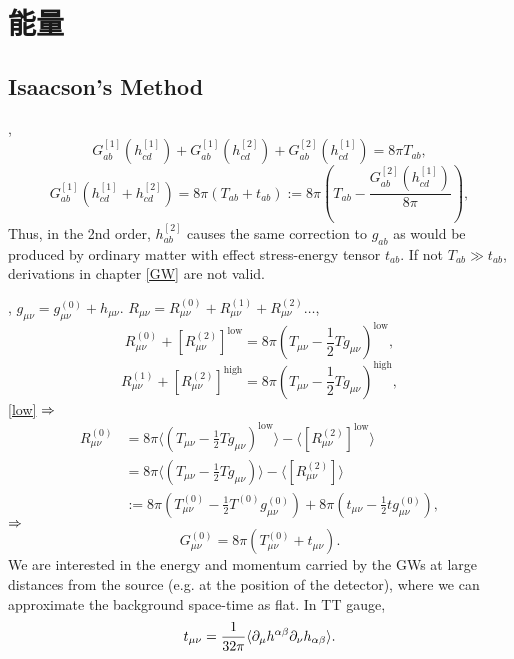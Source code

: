 \chapter{能量}

\section{Isaacson's Method}

\cite{Wald1984}, 
\begin{equation}
    G_{ab}^{[1]}(h_{cd}^{[1]})+G_{ab}^{[1]}(h_{cd}^{[2]})+G_{ab}^{[2]}(h_{cd}^{[1]})=8\pi T_{ab},
\end{equation}
\begin{equation}
    G_{ab}^{[1]}(h_{cd}^{[1]}+h_{cd}^{[2]})=8\pi (T_{ab}+t_{ab}):=8\pi (T_{ab}-\frac{G_{ab}^{[2]}(h_{cd}^{[1]})}{8\pi}),
\end{equation}
Thus, in the 2nd order, $h_{ab}^{[2]}$ causes the same correction to $g_{ab}$ as would be produced by ordinary matter with effect stress-energy tensor $t_{ab}$. If not $T_{ab}\gg t_{ab}$, derivations in chapter \ref{GW} are not valid.

\cite{Maggiore2014,Isaacson1968a}, $g_{\mu\nu}={g}_{\mu\nu}^{(0)}+h_{\mu\nu}$. $R_{\mu\nu}=R_{\mu\nu}^{(0)}+R_{\mu\nu}^{(1)}+R_{\mu\nu}^{(2)}\dots$,
\begin{equation}
    R_{\mu\nu}^{(0)}+[R_{\mu\nu}^{(2)}]^\text{low}=8\pi(T_{\mu\nu}-\frac{1}{2}Tg_{\mu\nu})^\text{low},\label{low}
\end{equation}
\begin{equation}
    R_{\mu\nu}^{(1)}+[R_{\mu\nu}^{(2)}]^\text{high}=8\pi(T_{\mu\nu}-\frac{1}{2}Tg_{\mu\nu})^\text{high},\label{high}
\end{equation}
\eqref{low} $\Rightarrow$
\begin{align}
    R_{\mu\nu}^{(0)}&=8\pi\langle (T_{\mu\nu}-\frac{1}{2}Tg_{\mu\nu})^\text{low}\rangle-\langle[R_{\mu\nu}^{(2)}]^\text{low}\rangle\\
    &=8\pi\langle (T_{\mu\nu}-\frac{1}{2}Tg_{\mu\nu})\rangle-\langle[R_{\mu\nu}^{(2)}]\rangle\\
    &:=8\pi({T}_{\mu\nu}^{(0)}-\frac{1}{2}{T}^{(0)}{g}_{\mu\nu}^{(0)})+8\pi(t_{\mu\nu}-\frac{1}{2}t{g}_{\mu\nu}^{(0)}),
\end{align}
$\Rightarrow$
\begin{equation}
    G_{\mu\nu}^{(0)}=8\pi({T}_{\mu\nu}^{(0)}+t_{\mu\nu}).
\end{equation}
We are interested in the energy and momentum carried by the GWs at large distances from the source (e.g.  at the position of the detector), where we can approximate the background space-time as flat. In TT gauge,
\begin{equation}
    t_{\mu\nu}=\frac{1}{32\pi}\langle\partial_\mu h^{\alpha\beta}\partial_\nu h_{\alpha\beta}\rangle.
\end{equation}
